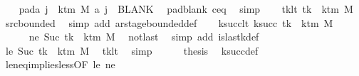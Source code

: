 \begin{isabellebody}
\ \ \isamarkupfalse%
\ pad{\isacharunderscore}{\kern0pt}a{\isacharcolon}{\kern0pt}\ {\isachardoublequoteopen}{\isasymforall}j\ {\isasymge}\ k{\isacharunderscore}{\kern0pt}tm\ M{\isachardot}{\kern0pt}\ {\isacharquery}{\kern0pt}a\ j\ {\isacharequal}{\kern0pt}\ BLANK{}{\isachardoublequoteclose}\ \isamarkupfalse%
\ pad{\isacharunderscore}{\kern0pt}blank\ c{\isacharprime}{\kern0pt}{\isacharunderscore}{\kern0pt}eq\ \isamarkupfalse%
\ simp\isanewline
\ \ \isamarkupfalse%
\ tk{\isacharunderscore}{\kern0pt}lt{\isacharcolon}{\kern0pt}\ {\isachardoublequoteopen}tk\ {\isacharless}{\kern0pt}\ k{\isacharunderscore}{\kern0pt}tm\ M{\isachardoublequoteclose}\ \isamarkupfalse%
\ src{\isacharunderscore}{\kern0pt}bounded\ \isamarkupfalse%
\ {\isacharparenleft}{\kern0pt}simp\ add{\isacharcolon}{\kern0pt}\ ar{\isacharunderscore}{\kern0pt}stage{\isacharunderscore}{\kern0pt}bounded{\isacharunderscore}{\kern0pt}def{\isacharparenright}{\kern0pt}\isanewline
\ \ \isamarkupfalse%
\ ksucc{\isacharunderscore}{\kern0pt}lt{\isacharcolon}{\kern0pt}\ {\isachardoublequoteopen}k{\isacharunderscore}{\kern0pt}succ\ tk\ {\isacharless}{\kern0pt}\ k{\isacharunderscore}{\kern0pt}tm\ M{\isachardoublequoteclose}\isanewline
\ \ \isamarkupfalse%
\ {\isacharminus}{\kern0pt}\isanewline
\ \ \ \ \isamarkupfalse%
\ ne{\isacharcolon}{\kern0pt}\ {\isachardoublequoteopen}Suc\ tk\ {\isasymnoteq}\ k{\isacharunderscore}{\kern0pt}tm\ M{\isachardoublequoteclose}\ \isamarkupfalse%
\ notlast\ \isamarkupfalse%
\ {\isacharparenleft}{\kern0pt}simp\ add{\isacharcolon}{\kern0pt}\ is{\isacharunderscore}{\kern0pt}last{\isacharunderscore}{\kern0pt}k{\isacharunderscore}{\kern0pt}def{\isacharparenright}{\kern0pt}\isanewline
\ \ \ \ \isamarkupfalse%
\ le{\isacharcolon}{\kern0pt}\ {\isachardoublequoteopen}Suc\ tk\ {\isasymle}\ k{\isacharunderscore}{\kern0pt}tm\ M{\isachardoublequoteclose}\ \isamarkupfalse%
\ tk{\isacharunderscore}{\kern0pt}lt\ \isamarkupfalse%
\ simp\isanewline
\ \ \ \ \isamarkupfalse%
\ {\isacharquery}{\kern0pt}thesis\ \isamarkupfalse%
\ k{\isacharunderscore}{\kern0pt}succ{\isacharunderscore}{\kern0pt}def\ \isamarkupfalse%
\ le{\isacharunderscore}{\kern0pt}neq{\isacharunderscore}{\kern0pt}implies{\isacharunderscore}{\kern0pt}less{\isacharbrackleft}{\kern0pt}OF\ le\ ne{\isacharbrackright}{\kern0pt}\ \isakeywordONE{{\isachardot}{\kern0pt}}\isamarkupfalse%

\end{isabellebody}
